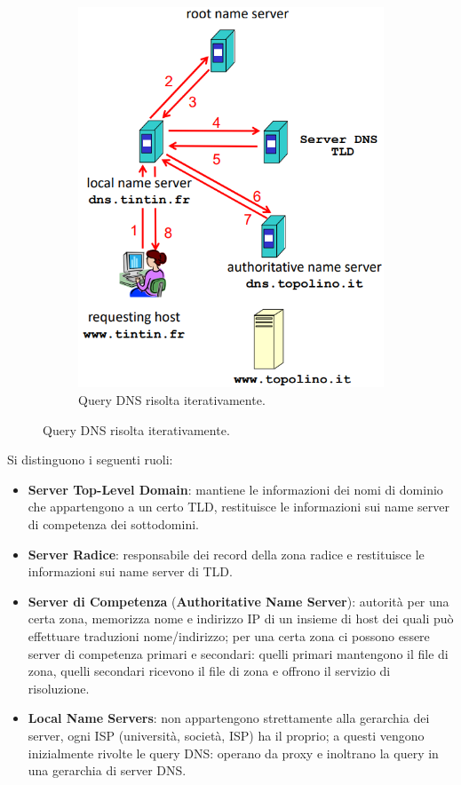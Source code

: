 \documentclass[11pt, italian, openany]{book}
\begin{document}
\begin{sloppypar}
\begin{itemize}[topsep=0pt]
\begin{figure}[!h]
\begin{subfigure}{0.49 \linewidth}
			\includegraphics[scale=0.35]{images/dns-query-iterativa.png}
			\caption{Query DNS risolta iterativamente.}
		\end{subfigure}
	\end{figure}

	Si distinguono i seguenti ruoli:
	\vspace{-3.5mm}
	\begin{itemize}
		\itemsep-0.3em
		\item \textbf{Server Top-Level Domain}: mantiene le informazioni dei nomi di dominio che appartengono a un certo TLD, restituisce le informazioni
		sui name server di competenza dei sottodomini.
		\item \textbf{Server Radice}: responsabile dei record della zona radice e restituisce le informazioni sui name server di TLD.
		\item \textbf{Server di Competenza} (\textbf{Authoritative Name Server}): autorità per una certa zona, memorizza nome e indirizzo IP di un insieme di
		host dei quali può effettuare traduzioni nome/indirizzo; per una certa zona ci possono essere server di competenza primari e secondari:
		quelli primari mantengono il file di zona, quelli secondari ricevono il file di zona e offrono il servizio di risoluzione.
		\item \textbf{Local Name Servers}: non appartengono strettamente alla gerarchia dei server, ogni ISP (università, società, ISP) ha il proprio; a questi
		vengono inizialmente rivolte le query DNS: operano da proxy e inoltrano la query in una gerarchia di server DNS.
	\end{itemize}


\end{itemize}
\end{sloppypar}
\end{document}

